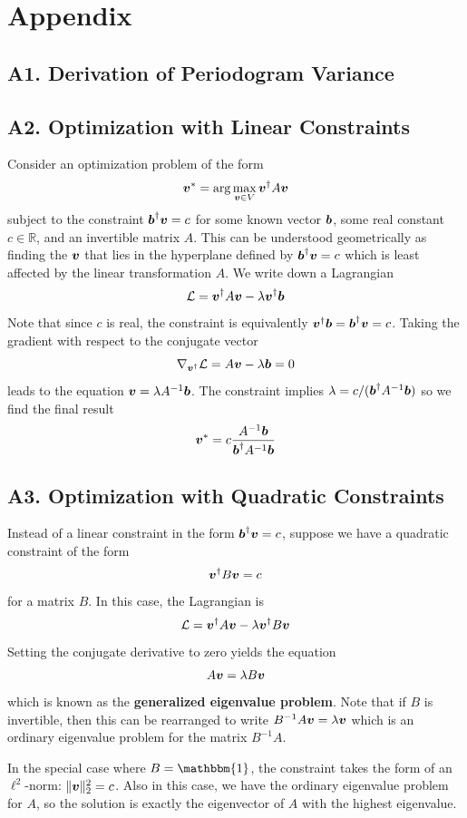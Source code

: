 \documentclass[twocolumn]{gwclass}
\newcommand{\R}{\mathbb{R}}
\begin{document}
\newpage

\section*{Appendix}
\subsection*{A1. Derivation of Periodogram Variance}


\subsection*{A2. Optimization with Linear Constraints}
Consider an optimization problem of the form
$$ \boldsymbol{v}^* = \arg\max_{\boldsymbol{v}\in V} \boldsymbol{v}^\dagger A\boldsymbol{v}  $$
subject to the constraint $\boldsymbol{b}^\dagger\boldsymbol{v} = c$ for some known vector $\boldsymbol{b}$, some real constant $c\in\R$, and an invertible matrix $A$. This can be understood geometrically as finding the $\boldsymbol{v}$ that lies in the hyperplane defined by $\boldsymbol{b}^\dagger\boldsymbol{v}=c$ which is least affected by the linear transformation $A$. We write down a Lagrangian
$$ \mathcal{L} = \boldsymbol{v}^\dagger A\boldsymbol{v} - \lambda \boldsymbol{v}^\dagger\boldsymbol{b} $$
Note that since $c$ is real, the constraint is equivalently $\boldsymbol{v}^\dagger\boldsymbol{b} = \boldsymbol{b}^\dagger\boldsymbol{v}=c$. Taking the gradient with respect to the conjugate vector
$$ \nabla_{\boldsymbol{v}^\dagger}\mathcal{L} = A\boldsymbol{v} - \lambda\boldsymbol{b} = 0 $$
leads to the equation $ \boldsymbol{v} = \lambda A^{-1}\boldsymbol{b}$. The constraint implies $\lambda = c/(\boldsymbol{b}^\dagger A^{-1}\boldsymbol{b})$ so we find the final result
$$ \boldsymbol{v}^* = c\frac{A^{-1}\boldsymbol{b}}{\boldsymbol{b}^\dagger A^{-1}\boldsymbol{b}} $$
\subsection*{A3. Optimization with Quadratic Constraints}
Instead of a linear constraint in the form $\boldsymbol{b}^\dagger\boldsymbol{v}=c$, suppose we have a quadratic constraint of the form
$$ \boldsymbol{v}^\dagger B\boldsymbol{v} = c $$
for a matrix $B$. In this case, the Lagrangian is
$$ \mathcal{L} = \boldsymbol{v}^\dagger A\boldsymbol{v} - \lambda\boldsymbol{v}^\dagger B\boldsymbol{v} $$
Setting the conjugate derivative to zero yields the equation 
$$ A\boldsymbol{v} = \lambda B\boldsymbol{v}  $$
which is known as the \textbf{generalized eigenvalue problem}. Note that if $B$ is invertible, then this can be rearranged to write $B^{-1}A\boldsymbol{v}=\lambda\boldsymbol{v}$ which is an ordinary eigenvalue problem for the matrix $B^{-1}A$. 

In the special case where $B=\mathbbm{1}$, the constraint takes the form of an $\ell^2$-norm: $\|\boldsymbol{v}\|_2^2=c$. Also in this case, we have the ordinary eigenvalue problem for $A$, so the solution is exactly the eigenvector of $A$ with the highest eigenvalue.
\end{document}
